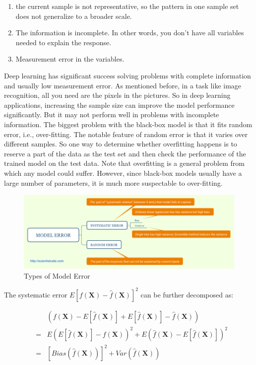 \documentclass[12pt,]{krantz}
\providecommand{\tightlist}{%
  \setlength{\itemsep}{0pt}\setlength{\parskip}{0pt}}
\begin{document}
\begin{enumerate}
\def\labelenumi{\arabic{enumi}.}
\tightlist
\item
  the current sample is not representative, so the pattern in one sample set does not generalize to a broader scale.
\item
  The information is incomplete. In other words, you don't have all variables needed to explain the response.
\item
  Measurement error in the variables.
\end{enumerate}

Deep learning has significant success solving problems with complete information and usually low measurement error. As mentioned before, in a task like image recognition, all you need are the pixels in the pictures. So in deep learning applications, increasing the sample size can improve the model performance significantly. But it may not perform well in problems with incomplete information. The biggest problem with the black-box model is that it fits random error, i.e., over-fitting. The notable feature of random error is that it varies over different samples. So one way to determine whether overfitting happens is to reserve a part of the data as the test set and then check the performance of the trained model on the test data. Note that overfitting is a general problem from which any model could suffer. However, since black-box models usually have a large number of parameters, it is much more suspectable to over-fitting.

\begin{figure}
\centering
\includegraphics{images/ModelError.png}
\caption{Types of Model Error}
\end{figure}

The systematic error \(E[f(\mathbf{X})-\hat{f}(\mathbf{X})]^{2}\) can be further decomposed as:

\begin{equation}
\begin{array}{ccc}
 &  & \left(f(\mathbf{X})-E[\hat{f}(\mathbf{X})]+E[\hat{f}(\mathbf{X})]-\hat{f}(\mathbf{X})\right)\\
 & = & E\left(E[\hat{f}(\mathbf{X})]-f(\mathbf{X})\right)^{2}+E\left(\hat{f}(\mathbf{X})-E[\hat{f}(\mathbf{X})]\right)^{2}\\
 & = & [Bias(\hat{f}(\mathbf{X}))]^{2}+Var(\hat{f}(\mathbf{X}))
\end{array}
\label{eq:biasvariance}
\end{equation}
\end{document}
